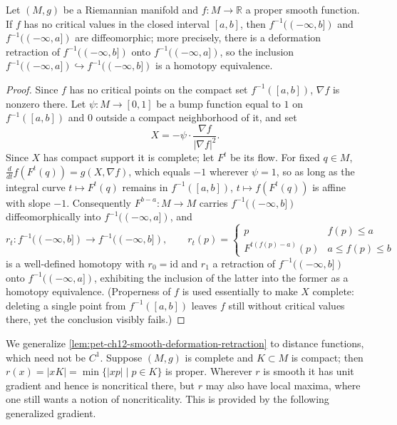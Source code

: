 \begin{lemma}
  \label{lem:pet-ch12-smooth-deformation-retraction}
  Let $(M,g)$ be a Riemannian manifold and $f:M\to\mathbb{R}$ a proper smooth
  function. If $f$ has no critical values in the closed interval $[a,b]$, then
  $f^{-1}((-\infty,b])$ and $f^{-1}((-\infty,a])$ are diffeomorphic; more
  precisely, there is a deformation retraction of $f^{-1}((-\infty,b])$ onto
  $f^{-1}((-\infty,a])$, so the inclusion
  $f^{-1}((-\infty,a])\hookrightarrow f^{-1}((-\infty,b])$ is a homotopy
  equivalence.
\end{lemma}
\begin{proof}
  Since $f$ has no critical points on the compact set $f^{-1}([a,b])$,
  $\nabla f$ is nonzero there. Let $\psi:M\to[0,1]$ be a bump function equal to
  $1$ on $f^{-1}([a,b])$ and $0$ outside a compact neighborhood of it, and set
  \[
    X=-\psi\cdot\frac{\nabla f}{|\nabla f|^2}.
  \]
  Since $X$ has compact support it is complete; let $F^t$ be its flow. For
  fixed $q\in M$, $\tfrac{d}{dt}f(F^t(q))=g(X,\nabla f)$, which equals $-1$
  wherever $\psi=1$, so as long as the integral curve $t\mapsto F^t(q)$ remains
  in $f^{-1}([a,b])$, $t\mapsto f(F^t(q))$ is affine with slope $-1$.
  Consequently $F^{b-a}:M\to M$ carries $f^{-1}((-\infty,b])$
  diffeomorphically into $f^{-1}((-\infty,a])$, and
  \[
    r_t:f^{-1}((-\infty,b])\to f^{-1}((-\infty,b]),\qquad
    r_t(p)=\begin{cases}p&f(p)\le a\\F^{t(f(p)-a)}(p)&a\le f(p)\le b\end{cases}
  \]
  is a well-defined homotopy with $r_0=\mathrm{id}$ and $r_1$ a retraction of
  $f^{-1}((-\infty,b])$ onto $f^{-1}((-\infty,a])$, exhibiting the inclusion of
  the latter into the former as a homotopy equivalence. (Properness of $f$ is
  used essentially to make $X$ complete: deleting a single point from
  $f^{-1}([a,b])$ leaves $f$ still without critical values there, yet the
  conclusion visibly fails.)
\end{proof}

We generalize \cref{lem:pet-ch12-smooth-deformation-retraction} to distance
functions, which need not be $C^1$. Suppose $(M,g)$ is complete and
$K\subset M$ is compact; then $r(x)=|xK|=\min\{|xp|\mid p\in K\}$ is proper.
Wherever $r$ is smooth it has unit gradient and hence is noncritical there,
but $r$ may also have local maxima, where one still wants a notion of
noncriticality. This is provided by the following generalized gradient.

